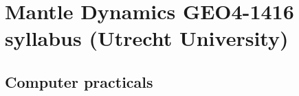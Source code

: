 \chapter{Mantle Dynamics GEO4-1416 syllabus (Utrecht University)} %



\newpage

\section{Computer practicals} 
